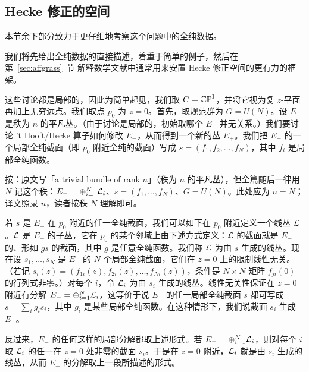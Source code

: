 
\subsection{Hecke 修正的空间}

\label{sec:spaceheck}

本节余下部分致力于更仔细地考察这个问题中的全纯数据。

我们将先给出全纯数据的直接描述，着重于简单的例子，然后在第~\ref{sec:affgrass}~节 解释数学文献中通常用来安置 Hecke 修正空间的更有力的框架。

这些讨论都是局部的，因此为简单起见，我们取 $C=\Bbb{CP}^1$，并将它视为复 $z$-平面再加上无穷远点。我们取点 $p_0$ 为 $z=0$。首先，取规范群为 $G=U(N)$。设 $E_-$ 是秩为 $n$ 的平凡丛。（由于讨论是局部的，初始取哪个 $E_-$ 并无关系。）我们要讨论 't Hooft/Hecke 算子如何修改 $E_-$，从而得到一个新的丛 $E_+$。我们把 $E_-$ 的一个局部全纯截面（即 $p_0$ 附近全纯的截面）写成 $s=(f_1,f_2,\dots,f_N)$，其中 $f_i$ 是局部全纯函数。

\begin{yizhu}[原文疑误]
按：原文写「a trivial bundle of rank $n$」（秩为 $n$ 的平凡丛），但全篇随后一律用 $N$ 记这个秩：$E_-=\oplus_{i=1}^N{\cal L}_i$、$s=(f_1,\dots,f_N)$、$G=U(N)$。此处应为 $n=N$；译文照录 $n$，读者按秩 $N$ 理解即可。
\end{yizhu}

若 $s$ 是 $E_-$ 在 $p_0$ 附近的任一全纯截面，我们可以如下在 $p_0$ 附近定义一个线丛 ${\cal L}$。${\cal L}$ 是 $E_-$ 的子丛，它在 $p_0$ 的某个邻域上由下述方式定义：${\cal L}$ 的截面就是 $E_-$ 的、形如 $gs$ 的截面，其中 $g$ 是任意全纯函数。我们称 ${\cal L}$ 为由 $s$ 生成的线丛。现在设 $s_1,\dots,s_N$ 是 $E_-$ 的 $N$ 个局部全纯截面，它们在 $z=0$ 上的限制线性无关。（若记 $s_i(z)=(f_{1i}(z),f_{2i}(z),\dots,f_{Ni}(z))$，条件是 $N\times N$ 矩阵 $f_{ji}(0)$ 的行列式非零。）对每个 $i$，令 ${\cal L}_i$ 为由 $s_i$ 生成的线丛。线性无关性保证在 $z=0$ 附近有分解 $E_-=\oplus_{i=1}^N{\cal L}_i$，这等价于说 $E_-$ 的任一局部全纯截面 $s$ 都可写成 $s=\sum_i g_is_i$，其中 $g_i$ 是某些局部全纯函数。在这种情形下，我们说截面 $s_i$ 生成 $E_-$。

反过来，$E_-$ 的任何这样的局部分解都取上述形式。若 $E_-=\oplus_{i=1}^N{\cal L}_i$，则对每个 $i$ 取 ${\cal L}_i$ 的任一在 $z=0$ 处非零的截面 $s_i$。于是在 $z=0$ 附近，${\cal L}_i$ 就是由 $s_i$ 生成的线丛，从而 $E_-$ 的分解取上一段所描述的形式。

